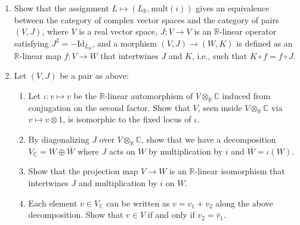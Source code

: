 \documentclass[12pt]{article}
\begin{document}
\begin{problab}{2}
    \begin{enumerate}
        \item Show that the assignment $L \mapsto (L_{\mathbb{R}}, \text{mult}(i))$ gives an equivalence between the category of complex vector spaces and the category of pairs $(V, J)$, where $V$ is a real vector space, $J : V \to V$ is an $\mathbb{R}$-linear operator satisfying $J^2 = -\mathrm{Id}_{L_\mathbb{R}}$, and a morphism $(V, J) \to (W, K)$ is defined as an $\mathbb{R}$-linear map $f : V \to W$ that intertwines $J$ and $K$, i.e., such that $K \circ f = f \circ J$.

        \item Let $(V, J)$ be a pair as above:
        \begin{enumerate}
            \item Let $\iota : v \mapsto v$ be the $\mathbb{R}$-linear automorphism of $V \otimes_{\mathbb{R}} \mathbb{C}$ induced from conjugation on the second factor. Show that $V$, seen inside $V \otimes_{\mathbb{R}} \mathbb{C}$ via $v \mapsto v \otimes 1$, is isomorphic to the fixed locus of $\iota$.
            \item By diagonalizing $J$ over $V \otimes_{\mathbb{R}} \mathbb{C}$, show that we have a decomposition $V_{\mathbb{C}} = W \oplus \bar{W}$ where $J$ acts on $W$ by multiplication by $i$ and $\bar{W} = \iota(W)$.
            \item Show that the projection map $V \to W$ is an $\mathbb{R}$-linear isomorphism that intertwines $J$ and multiplication by $i$ on $W$.
            \item Each element $v \in V_{\mathbb{C}}$ can be written as $v = v_1 + v_2$ along the above decomposition. Show that $v \in V$ if and only if $v_2 = \bar{v}_1$.
        \end{enumerate}
    \end{enumerate}
\end{problab}
\newpage
\end{document}
